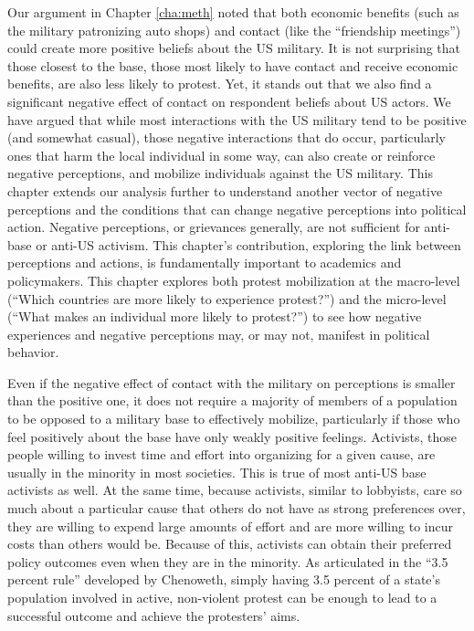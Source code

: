 		Our argument in Chapter \ref{cha:meth} noted that both economic benefits (such as the military patronizing auto shops) and contact (like the ``friendship meetings'') could create more positive beliefs about the US military. It is not surprising that those closest to the base, those most likely to have contact and receive economic benefits, are also less likely to protest. Yet, it stands out that we also find a significant negative effect of contact on respondent beliefs about US actors. We have argued that while most interactions with the US military tend to be positive  (and somewhat casual), those negative interactions that do occur, particularly ones that harm the local individual in some way, can also create or reinforce negative perceptions, and mobilize individuals against the US military. This chapter extends our analysis further to understand another vector of negative perceptions and the conditions that can change negative perceptions into political action. Negative perceptions, or grievances generally, are not sufficient for anti-base or anti-US activism. This chapter's contribution, exploring the link between perceptions and actions, is fundamentally important to academics and policymakers. This chapter explores both protest mobilization at the macro-level (``Which countries are more likely to experience protest?'') and the micro-level (``What makes an individual more likely to protest?'') to see how negative experiences and negative perceptions may, or may not, manifest in political behavior. 
		
		Even if the negative effect of contact with the military on perceptions is smaller than the positive one, it does not require a majority of members of a population to be opposed to a military base to effectively mobilize, particularly if those who feel positively about the base have only weakly positive feelings. Activists, those people willing to invest time and effort into organizing for a given cause, are usually in the minority in most societies.\cite{Burstein2002}  This is true of most anti-US base activists as well.\cite{Fitz2015}  At the same time, because activists, similar to lobbyists, care so much about a particular cause that others do not have as strong preferences over, they are willing to expend large amounts of effort and are more willing to incur costs than others would be.  Because of this, activists can obtain their preferred policy outcomes even when they are in the minority. As articulated in the ``3.5 percent rule'' developed by Chenoweth, simply having 3.5 percent of a state's population involved in active, non-violent protest can be enough to lead to a successful outcome and achieve the protesters' aims.\cite{Chenoweth2011} 
		
